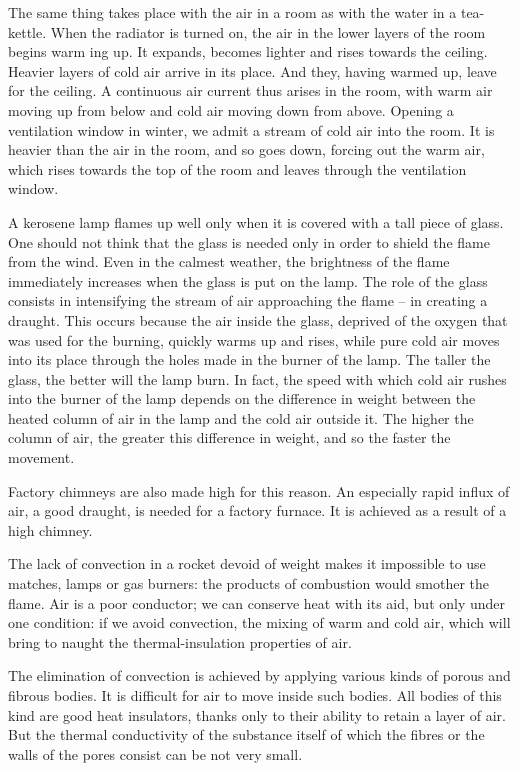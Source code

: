 The same thing takes place with the air in a room as with the water in a tea-kettle. When the radiator is turned on, the air in the lower layers of the room begins warm­ ing up. It expands, becomes lighter and rises towards the ceiling. Heavier layers of cold air arrive in its place. And they, having warmed up, leave for the ceiling. A contin­uous air current thus arises in the room, with warm air moving up from below and cold air moving down from above. Opening a ventilation window in winter, we admit a stream of cold air into the room. It is heavier than the air in the room, and so goes down, forcing out the warm air, which rises towards the top of the room and leaves through the ventilation window.

A kerosene lamp flames up well only when it is covered with a tall piece of glass. One should not think that the glass is needed only in order to shield the flame from the wind. Even in the calmest weather, the brightness of the flame immediately increases when the glass is put on the lamp. The role of the glass consists in intensifying the stream of air approaching the flame -- in creating a draught. This occurs because the air inside the glass, deprived of the oxygen that was used for the burning, quick­ly warms up and rises, while pure cold air moves into its place through the holes made in the burner of the lamp.
The taller the glass, the better will the lamp burn. In fact, the speed with which cold air rushes into the burner of the lamp depends on the difference in weight between the heated column of air in the lamp and the cold air outside it. The higher the column of air, the greater this difference in weight, and so the faster the movement.

Factory chimneys are also made high for this reason. An especially rapid influx of air, a good draught, is needed for a factory furnace. It is achieved as a result of a high chimney.

The lack of convection in a rocket devoid of weight makes it impossible to use matches, lamps or gas burners: the products of combustion would smother the flame. Air is a poor conductor; we can conserve heat with its aid, but only under one condition: if we avoid convection, the mixing of warm and cold air, which will bring to naught the thermal-insulation properties of air.


The elimination of convection is achieved by applying various kinds of porous and fibrous bodies. It is difficult for air to move inside such bodies. All bodies of this kind are good heat insulators, thanks only to their ability to retain a layer of air. But the thermal conductivity of the substance itself of which the fibres or the walls of the
pores consist can be not very small.


